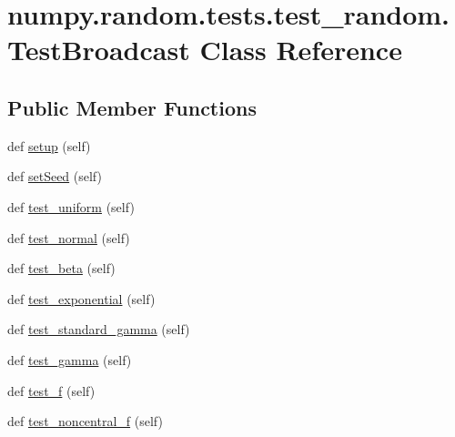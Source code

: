 \hypertarget{classnumpy_1_1random_1_1tests_1_1test__random_1_1TestBroadcast}{}\section{numpy.\+random.\+tests.\+test\+\_\+random.\+Test\+Broadcast Class Reference}
\label{classnumpy_1_1random_1_1tests_1_1test__random_1_1TestBroadcast}
\subsection*{Public Member Functions}
\begin{DoxyCompactItemize}
\item 
def \hyperlink{classnumpy_1_1random_1_1tests_1_1test__random_1_1TestBroadcast_ab10f3cb2ba68026e34ad1e9d6993bca3}{setup} (self)
\item 
def \hyperlink{classnumpy_1_1random_1_1tests_1_1test__random_1_1TestBroadcast_a6b370ec765ba8900b70b4ddda227857e}{set\+Seed} (self)
\item 
def \hyperlink{classnumpy_1_1random_1_1tests_1_1test__random_1_1TestBroadcast_ac65a4dac283958e03b049cb2f282fa50}{test\+\_\+uniform} (self)
\item 
def \hyperlink{classnumpy_1_1random_1_1tests_1_1test__random_1_1TestBroadcast_a164cae38f032d2c40f565d5a4e173192}{test\+\_\+normal} (self)
\item 
def \hyperlink{classnumpy_1_1random_1_1tests_1_1test__random_1_1TestBroadcast_aac5ed2172cca5d0075f5ea800d3e679b}{test\+\_\+beta} (self)
\item 
def \hyperlink{classnumpy_1_1random_1_1tests_1_1test__random_1_1TestBroadcast_a7617ecbc421559405c93e070a0d92f42}{test\+\_\+exponential} (self)
\item 
def \hyperlink{classnumpy_1_1random_1_1tests_1_1test__random_1_1TestBroadcast_a693679716178d069d91aa71ffa7402ba}{test\+\_\+standard\+\_\+gamma} (self)
\item 
def \hyperlink{classnumpy_1_1random_1_1tests_1_1test__random_1_1TestBroadcast_a8374f0f35046f41d4beb87cd520374cd}{test\+\_\+gamma} (self)
\item 
def \hyperlink{classnumpy_1_1random_1_1tests_1_1test__random_1_1TestBroadcast_a4929fed983479c51185bbee5105598d1}{test\+\_\+f} (self)
\item 
def \hyperlink{classnumpy_1_1random_1_1tests_1_1test__random_1_1TestBroadcast_aaabf8a1369b615eb98d1c231858209bb}{test\+\_\+noncentral\+\_\+f} (self)

\end{DoxyCompactItemize}
